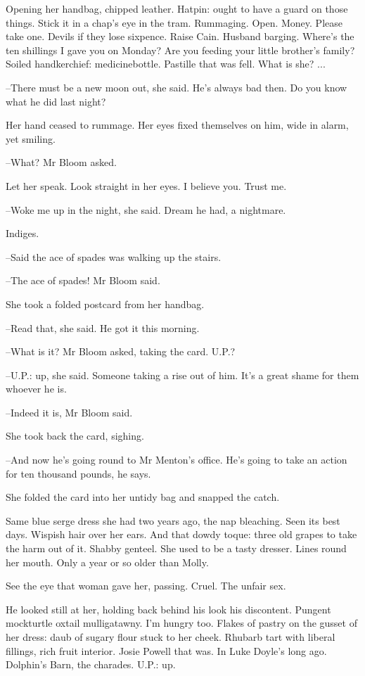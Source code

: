 Opening her handbag, chipped leather. Hatpin: ought to have a
guard on those things. Stick it in a chap's eye in the tram. Rummaging.
Open. Money. Please take one. Devils if they lose sixpence. Raise Cain.
Husband barging. Where's the ten shillings I gave you on Monday? Are
you feeding your little brother's family? Soiled handkerchief:
medicinebottle. Pastille that was fell. What is she? ...

--There must be a new moon out, she said. He's always bad then. Do you
know what he did last night?

Her hand ceased to rummage. Her eyes fixed themselves on him, wide
in alarm, yet smiling.

--What? Mr Bloom asked.

Let her speak. Look straight in her eyes. I believe you. Trust me.

--Woke me up in the night, she said. Dream he had, a nightmare.

Indiges.

--Said the ace of spades was walking up the stairs.

--The ace of spades! Mr Bloom said.

She took a folded postcard from her handbag.

--Read that, she said. He got it this morning.

--What is it? Mr Bloom asked, taking the card. U.P.?

--U.P.: up, she said. Someone taking a rise out of him. It's a great shame
for them whoever he is.

--Indeed it is, Mr Bloom said.

She took back the card, sighing.

--And now he's going round to Mr Menton's office. He's going to take an
action for ten thousand pounds, he says.

She folded the card into her untidy bag and snapped the catch.

Same blue serge dress she had two years ago, the nap bleaching. Seen
its best days. Wispish hair over her ears. And that dowdy toque: three old
grapes to take the harm out of it. Shabby genteel. She used to be a tasty
dresser. Lines round her mouth. Only a year or so older than Molly.

See the eye that woman gave her, passing. Cruel. The unfair sex.

He looked still at her, holding back behind his look his discontent.
Pungent mockturtle oxtail mulligatawny. I'm hungry too. Flakes of pastry
on the gusset of her dress: daub of sugary flour stuck to her cheek.
Rhubarb tart with liberal fillings, rich fruit interior. Josie Powell that
was. In Luke Doyle's long ago. Dolphin's Barn, the charades. U.P.: up.

